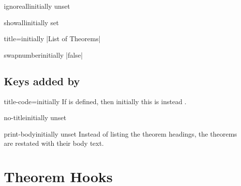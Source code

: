 \documentclass{ltxdoc}
\newcommand{\ttbraces}[1]{\braces{\texttt{#1}}}
\begin{document}
\begin{docKey}{ignoreall}{}{initially unset}

\end{docKey}

\begin{docKey}{showall}{}{initially set}

\end{docKey}

\begin{docKey}{title}{=}{initially |List of Theorems|}

\end{docKey}

\begin{docKey}{swapnumber}{}{initially |false|}

\end{docKey}

\subsection{Keys added by }

\begin{docKey}{title-code}{=}{initially \ttbraces{\#1}}
If  is defined, then initially this is instead \ttbraces{\#1}.
\end{docKey}

\begin{docKey}{no-title}{}{initially unset}

\end{docKey}

\begin{docKey}{print-body}{}{initially unset}
Instead of listing the theorem headings, the theorems are restated with their body text.
\end{docKey}

\section{Theorem Hooks} \label{thmkeys-hooks}
\end{document}
